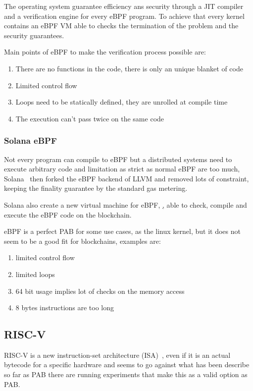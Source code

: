\documentclass[../main.tex]{subfiles}
\begin{document}
The operating system guarantee efficiency ans security through a JIT compiler and a verification engine for every eBPF program. To achieve that every kernel contains an eBPF VM able to checks the termination of the problem and the security guarantees.

Main points of eBPF to make the verification process possible are:~\cite{ebpf}
\begin{enumerate}
  \item There are no functions in the code, there is only an unique blanket of code
  \item Limited control flow
  \item Loops need to be statically defined, they are unrolled at compile time
  \item The execution can't pass twice on the same code
\end{enumerate}

\subsubsection{Solana eBPF}

Not every program can compile to eBPF but a distributed systems need to execute arbitrary code and limitation as strict as normal eBPF are too much, Solana~\cite{yakovenko2018solana} then forked the eBPF backend of LLVM and removed lots of constraint, keeping the finality guarantee by the standard gas metering.~\cite{ebpf-contracts}

Solana also create a new virtual machine for eBPF, \href{https://github.com/qmonnet/rbpf}, able to check, compile and execute the eBPF code on the blockchain.

eBPF is a perfect PAB for some use cases, as the linux kernel, but it does not seem to be a good fit for blockchains, examples are:
\begin{enumerate}
  \item limited control flow
  \item limited loops
  \item 64 bit usage implies lot of checks on the memory access
  \item 8 bytes instructions are too long
\end{enumerate}

\subsection{RISC-V}

RISC-V is a new instruction-set architecture (ISA)~\cite{risc-v-spec}, even if it is an actual bytecode for a specific hardware and seems to go against what has been describe so far as PAB there are running experiments that make this as a valid option as PAB.
\end{document}
